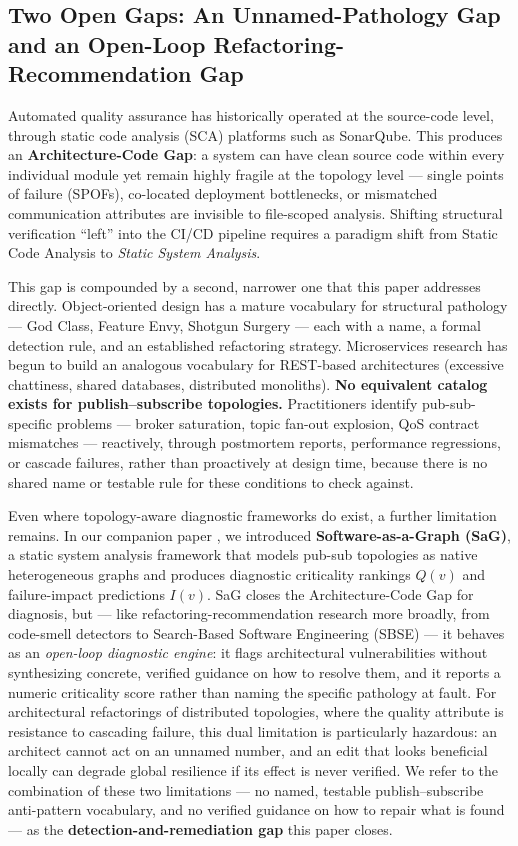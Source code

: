 \documentclass[11pt]{article}
\begin{document}
\subsection{Two Open Gaps: An Unnamed-Pathology Gap and an Open-Loop Refactoring-Recommendation Gap}

Automated quality assurance has historically operated at the source-code level, through static code
analysis (SCA) platforms such as SonarQube. This produces an \textbf{Architecture-Code Gap}: a system
can have clean source code within every individual module yet remain highly fragile at the topology
level --- single points of failure (SPOFs), co-located deployment bottlenecks, or mismatched
communication attributes are invisible to file-scoped analysis. Shifting structural verification
``left'' into the CI/CD pipeline requires a paradigm shift from Static Code Analysis to \emph{Static
System Analysis}.

This gap is compounded by a second, narrower one that this paper addresses directly. Object-oriented
design has a mature vocabulary for structural pathology --- God Class, Feature Envy, Shotgun Surgery
--- each with a name, a formal detection rule, and an established refactoring strategy. Microservices
research has begun to build an analogous vocabulary for REST-based architectures (excessive
chattiness, shared databases, distributed monoliths). \textbf{No equivalent catalog exists for
publish--subscribe topologies.} Practitioners identify pub-sub-specific problems --- broker
saturation, topic fan-out explosion, QoS contract mismatches --- reactively, through postmortem
reports, performance regressions, or cascade failures, rather than proactively at design time, because
there is no shared name or testable rule for these conditions to check against.

Even where topology-aware diagnostic frameworks do exist, a further limitation remains. In our
companion paper \cite{SaG}, we introduced \textbf{Software-as-a-Graph (SaG)}, a static system analysis
framework that models pub-sub topologies as native heterogeneous graphs and produces diagnostic
criticality rankings $Q(v)$ and failure-impact predictions $I(v)$. SaG closes the Architecture-Code Gap
for diagnosis, but --- like refactoring-recommendation research more broadly, from code-smell
detectors to Search-Based Software Engineering (SBSE) --- it behaves as an \emph{open-loop diagnostic
engine}: it flags architectural vulnerabilities without synthesizing concrete, verified guidance on how
to resolve them, and it reports a numeric criticality score rather than naming the specific pathology
at fault. For architectural refactorings of distributed topologies, where the quality attribute is
resistance to cascading failure, this dual limitation is particularly hazardous: an architect cannot
act on an unnamed number, and an edit that looks beneficial locally can degrade global resilience if
its effect is never verified. We refer to the combination of these two limitations --- no named,
testable publish--subscribe anti-pattern vocabulary, and no verified guidance on how to repair what is
found --- as the \textbf{detection-and-remediation gap} this paper closes.
\end{document}

